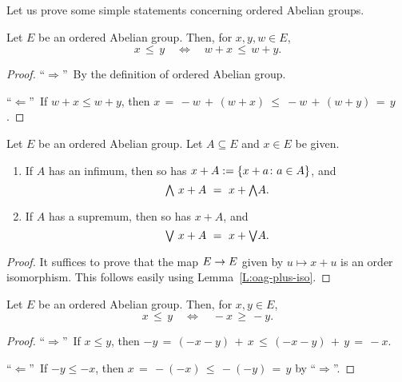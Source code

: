 \documentclass[main.tex]{subfiles}
\begin{document}
\noindent
Let us prove some simple statements
concerning ordered Abelian groups.
%
%
\begin{lem}
\label{L:oag-plus-iso}
Let $E$ be an ordered Abelian group.
Then, for $x,y,w\in E$,
\begin{equation*}
x \,\leq\, y \quad\iff\quad w+x \,\leq\, w+y.
\end{equation*}
\end{lem}
\begin{proof}
``$\Longrightarrow$''\ 
By the definition of ordered Abelian group.

\noindent ``$\Longleftarrow$''\ 
If $w+x\leq w+y$, then $x \,=\,-w\,+\, (w+x) \ \leq\ 
-w\,+\,(w+y) \,=\, y$.
\end{proof}
%
%
\begin{lem}
\label{L:oag-plus-preserves}
Let $E$ be an ordered Abelian group.
Let $A\subseteq E$ and $x\in E$ be given.
\begin{enumerate}
\item \label{L:oag-plus-preserves-meet}
If $A$ has an infimum,
then so has $x+A := \{ x+a\colon a\in A\}$,
and 
\begin{equation*}
\textstyle{\bigwedge} \,\,x+A \ =\  x+\textstyle{\bigwedge} A.
\end{equation*}
\item \label{L:oag-plus-preserves-join}
If $A$ has a supremum,
then so has $x+A$,
and 
\begin{equation*}
\textstyle{\bigvee} \,\,x+A \ =\  x+\textstyle{\bigvee} A.
\end{equation*}
\end{enumerate}
\end{lem}
\begin{proof}
It suffices to prove that the map $E\rightarrow E$
given by $u\mapsto x + u$ is an order isomorphism.
This follows easily using Lemma~\ref{L:oag-plus-iso}.
\end{proof}
%
%
\begin{lem}
\label{L:oag-minus-iso}
Let $E$ be an ordered Abelian group.
Then, for $x,y\in E$,
\begin{equation*}
x \,\leq\, y \quad\iff\quad -x \,\geq\, -y.
\end{equation*}
\end{lem}
\begin{proof}
``$\Longrightarrow$''\ 
If $x\leq y$, then
$-y \,=\, (-x-y)\,+\,x
\,\leq\, (-x-y)\,+\, y
\,=\, -x$.

\noindent ``$\Longleftarrow$''\ 
If $-y \leq -x$,
then $x\,=\,-(-x) \,\leq\, -(-y) \,=\, y$
by ``$\Longrightarrow$''.
\end{proof}
\end{document}

